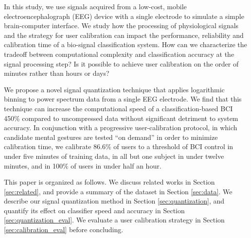 In this study, we use signals acquired from a low-cost, mobile electroencephalograph (EEG) device with a single electrode to simulate a simple brain-computer interface. We study how the processing of physiological signals and the strategy for user calibration can impact the performance, reliability and calibration time of a bio-signal classification system. How can we characterize the tradeoff between computational complexity and classification accuracy at the signal processing step? Is it possible to achieve user calibration on the order of minutes rather than hours or days?


We propose a novel signal quantization technique that applies logarithmic binning to power spectrum data from a single EEG electrode. We find that this technique can increase the computational speed of a classification-based BCI 450\% compared to uncompressed data without significant detriment to system accuracy. In conjunction with a progressive user-calibration protocol, in which candidate mental gestures are tested ``on demand'' in order to minimize calibration time, we calibrate 86.6\% of users to a threshold of BCI control in under five minutes of training data, in all but one subject in under twelve minutes, and in 100\% of users in under half an hour. 

This paper is organized as follows. We discuss related works in Section \ref{sec:related}, and provide a summary of the dataset in Section \ref{sec:data}. We describe our signal quantization method in Section \ref{sec:quantization}, and quantify its effect on classifier speed and accuracy in Section \ref{sec:quantization_eval}. We evaluate a user calibration strategy in Section \ref{sec:calibration_eval} before concluding.

